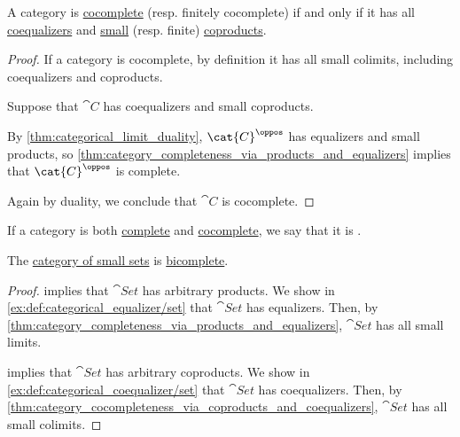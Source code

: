 \begin{proposition}\label{thm:category_cocompleteness_via_coproducts_and_coequalizers}
  A category is \hyperref[def:cocomplete_category]{cocomplete} (resp. finitely cocomplete) if and only if it has all \hyperref[def:categorical_coequalizer]{coequalizers} and \hyperref[def:categorical_diagram/small]{small} (resp. finite) \hyperref[def:categorical_coproduct]{coproducts}.
\end{proposition}
\begin{proof}
  \SufficiencySubProof If a category is cocomplete, by definition it has all small colimits, including coequalizers and coproducts.

  \SufficiencySubProof Suppose that \( \cat{C} \) has coequalizers and small coproducts.

  By \cref{thm:categorical_limit_duality}, \( \cat{C}^\oppos \) has equalizers and small products, so \cref{thm:category_completeness_via_products_and_equalizers} implies that \( \cat{C}^\oppos \) is complete.

  Again by duality, we conclude that \( \cat{C} \) is cocomplete.
\end{proof}

\begin{definition}\label{def:bicomplete_category}
  If a category is both \hyperref[def:complete_category]{complete} and \hyperref[def:cocomplete_category]{cocomplete}, we say that it is .
\end{definition}

\begin{proposition}\label{thm:category_of_small_sets_is_bicomplete}
  The \hyperref[def:category_of_small_sets]{category of small sets} is \hyperref[def:bicomplete_category]{bicomplete}.
\end{proposition}
\begin{proof}
   implies that \( \cat{Set} \) has arbitrary products. We show in \cref{ex:def:categorical_equalizer/set} that \( \cat{Set} \) has equalizers. Then, by \cref{thm:category_completeness_via_products_and_equalizers}, \( \cat{Set} \) has all small limits.

   implies that \( \cat{Set} \) has arbitrary coproducts. We show in \cref{ex:def:categorical_coequalizer/set} that \( \cat{Set} \) has coequalizers. Then, by \cref{thm:category_cocompleteness_via_coproducts_and_coequalizers}, \( \cat{Set} \) has all small colimits.
\end{proof}

